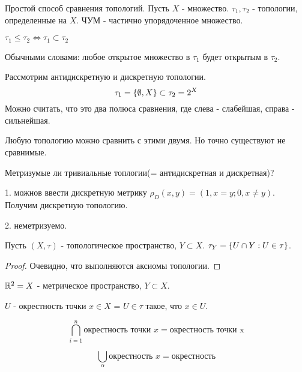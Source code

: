 Простой способ сравнения топологий. Пусть $X$ - множество. $\tau_1, \tau_2$ - топологии, определенные на $X$.
ЧУМ - частично упорядоченное множество.
\begin{definition}
    $\tau_1 \leq \tau_2 \Leftrightarrow \tau_1 \subset \tau_2$
\end{definition}
Обычными словами: любое открытое множество в $\tau_1$ будет открытым в $\tau_2$.

\begin{example}
    Рассмотрим антидискретную и дискретную топологии. 
    \[
        \tau_1 = \left\{\emptyset, X\right\} \subset \tau_2 = 2^{X}
    \]
    Можно считать, что это два полюса сравнения, где слева - слабейшая, справа - сильнейшая.  

    Любую топологию можно сравнить с этими двумя.
    Но точно существуют не сравнимые.
\end{example}

\begin{exercise}
    Метризумые ли тривиальные топлогии(= антидискретная и дискретная)?

    1. можнов ввести дискретную метрику $\rho_{D}(x, y) = (1, x = y; 0, x \neq y)$. Получим дискретную топологию.

    2. неметризуемо.
\end{exercise}

\begin{definition}
    Пусть $(X, \tau)$ - топологическое пространство, $Y \subset X$. $\tau_{Y} = \left\{U \cap Y : U \in \tau\right\}$.
\end{definition}
\begin{proof}
    Очевидно, что выполняются аксиомы топологии.
\end{proof}


\begin{example}
    $\mathbb{R}^2 = X$ - метрическое пространство, $Y \subset X$. 
\end{example}

\begin{definition}
    $U$ - окрестность точки $x \in X$ = $U \in \tau$ такое, что $x \in U$. 
\end{definition}

\begin{nota_bene}
    \[
        \bigcap_{i = 1}^{n} \text{окрестность точки } x = \text{окрестность точки x}
    \]

    \[
        \bigcup_{\alpha} \text{окрестность } x = \text{окрестность}
    \]
\end{nota_bene}

